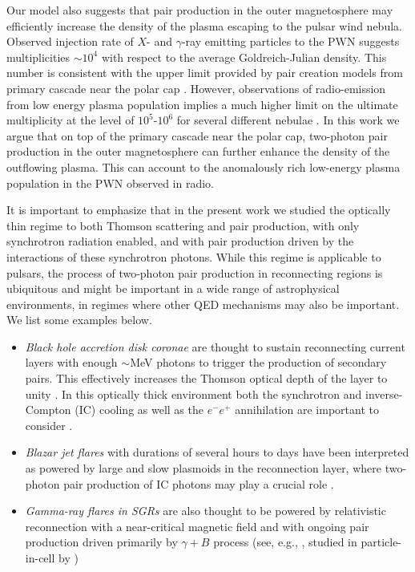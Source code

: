 Our model also suggests that pair production in the outer magnetosphere may efficiently increase the density of the plasma escaping to the pulsar wind nebula. Observed injection rate of $X$- and $\gamma$-ray emitting particles to the PWN suggests multiplicities $\sim 10^4$ with respect to the average Goldreich-Julian density. This number is consistent with the upper limit provided by pair creation models from primary cascade near the polar cap \citep{2018arXiv180308924T}. However, observations of radio-emission from low energy plasma population implies a much higher limit on the ultimate multiplicity at the level of $10^5\text{-}10^6$ for  several different nebulae \citep{2010ApJ...720..266S, 2011MNRAS.410..381B, 2012SSRv..173..341A}. In this work we argue that on top of the primary cascade near the polar cap, two-photon pair production in the outer magnetosphere can further enhance the density of the outflowing plasma. This can account to the anomalously rich low-energy plasma population in the PWN observed in radio.

It is important to emphasize that in the present work we studied the optically thin regime to both Thomson scattering and pair production, with only synchrotron radiation enabled, and with pair production driven by the interactions of these synchrotron photons. While this regime is applicable to pulsars, the process of two-photon pair production in reconnecting regions is ubiquitous and might be important in a wide range of astrophysical environments, in regimes where other QED mechanisms may also be important. We list some examples below.\par

\begin{itemize}[leftmargin=*,wide = 0pt]
    \item {\it Black hole accretion disk coronae} are thought to sustain reconnecting current layers with enough $\sim$MeV photons to trigger the production of secondary pairs. This effectively increases the Thomson optical depth of the layer to unity \citep{1983MNRAS.205..593G, 1987MNRAS.227..403S, 1993ApJ...413..507H}. In this optically thick environment both the synchrotron and inverse-Compton (IC) cooling as well as the $e^-e^+$ annihilation are important to consider \citep{2017ApJ...850..141B}.
    \item {\it Blazar jet flares} with durations of several hours to days have been interpreted as powered by large and slow plasmoids in the reconnection layer, where two-photon pair production of IC photons may play a crucial role \citep{2012MNRAS.424L..26G, 2016MNRAS.462.3325P}.
    \item {\it Gamma-ray flares in SGRs} are also thought to be powered by relativistic reconnection with a near-critical magnetic field and with ongoing pair production driven primarily by $\gamma+B$ process (see, e.g., \citealt{2001ApJ...561..980T, 2006MNRAS.367.1594L}, studied in particle-in-cell by \citealt{2018arXiv180709750S})
\end{itemize}

